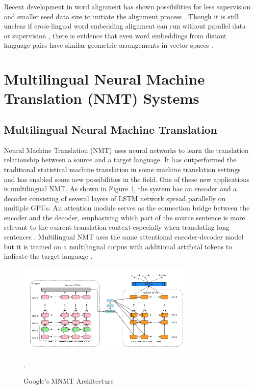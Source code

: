 \documentclass[thesis]{cluu}
\begin{document}
Recent development in word alignment has shown possibilities for less supervision and smaller seed data size to initiate the alignment process \parencite{Ruder:2019aa}. Though it is still unclear if cross-lingual word embedding alignment can run without parallel data or supervision \parencite{Dyer1365879}, there is evidence that even word embeddings from distant language pairs have similar geometric arrangements in vector spaces \parencite{Mikolov:2013ac}.

\section{Multilingual Neural Machine Translation (NMT) Systems}

\subsection{Multilingual Neural Machine Translation}

Neural Machine Translation (NMT) uses neural networks to learn the translation relationship between a source and a target language. It has outperformed the traditional statistical machine translation in some machine translation settings and has enabled some new possibilities in the field. One of these new applications is multilingual NMT. As shown in Figure \ref{fig:google_mnmt}, the system has an encoder and a decoder consisting of several layers of LSTM network spread parallelly on multiple GPUs. An attention module serves as the connection bridge between the encoder and the decoder, emphasizing which part of the source sentence is more relevant to the current translation context especially when translating long sentences \parencite{Wu:2016aa}. Multilingual NMT uses the same attentional encoder-decoder model but it is trained on a multilingual corpus with additional artificial tokens to indicate the target language \parencite{Johnson:2016aa}.

\begin{figure}
  \centering
  \includegraphics[width=0.8\textwidth]{google_mnmt_architecture.png}
  \caption{Google's MNMT Architecture \parencite{Johnson:2016aa,Wu:2016aa}}.
  \label{fig:google_mnmt}
\end{figure}
\end{document}
